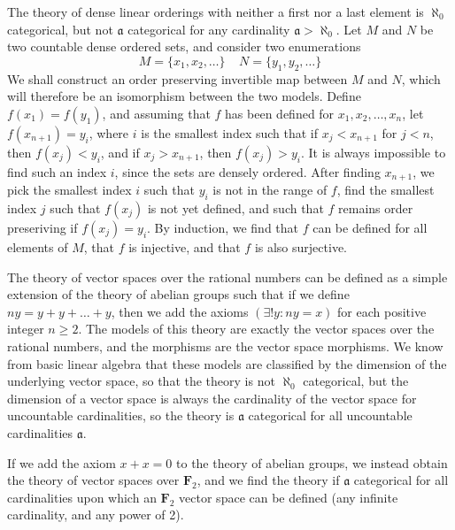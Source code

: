 \begin{example}
    The theory of dense linear orderings with neither a first nor a last element is $\aleph_0$ categorical, but not $\mathfrak{a}$ categorical for any cardinality $\mathfrak{a} > \aleph_0$. Let $M$ and $N$ be two countable dense ordered sets, and consider two enumerations
    \[ M = \{ x_1, x_2, \dots \}\ \ \ \ \ N = \{ y_1, y_2, \dots \} \]
    We shall construct an order preserving invertible map between $M$ and $N$, which will therefore be an isomorphism between the two models. Define $f(x_1) = f(y_1)$, and assuming that $f$ has been defined for $x_1, x_2, \dots, x_n$, let $f(x_{n+1}) = y_i$, where $i$ is the smallest index such that if $x_j < x_{n+1}$ for $j < n$, then $f(x_j) < y_i$, and if $x_j > x_{n+1}$, then $f(x_j) > y_i$. It is always impossible to find such an index $i$, since the sets are densely ordered. After finding $x_{n+1}$, we pick the smallest index $i$ such that $y_i$ is not in the range of $f$, find the smallest index $j$ such that $f(x_j)$ is not yet defined, and such that $f$ remains order preseriving if $f(x_j) = y_i$. By induction, we find that $f$ can be defined for all elements of $M$, that $f$ is injective, and that $f$ is also surjective.
\end{example}

\begin{example}
    The theory of vector spaces over the rational numbers can be defined as a simple extension of the theory of abelian groups such that if we define $ny = y + y + \dots + y$, then we add the axioms $(\exists ! y: ny = x)$ for each positive integer $n \geq 2$. The models of this theory are exactly the vector spaces over the rational numbers, and the morphisms are the vector space morphisms. We know from basic linear algebra that these models are classified by the dimension of the underlying vector space, so that the theory is not $\aleph_0$ categorical, but the dimension of a vector space is always the cardinality of the vector space for uncountable cardinalities, so the theory is $\mathfrak{a}$ categorical for all uncountable cardinalities $\mathfrak{a}$.
\end{example}

\begin{example}
    If we add the axiom $x + x = 0$ to the theory of abelian groups, we instead obtain the theory of vector spaces over $\mathbf{F}_2$, and we find the theory if $\mathfrak{a}$ categorical for all cardinalities upon which an $\mathbf{F}_2$ vector space can be defined (any infinite cardinality, and any power of 2).
\end{example}

